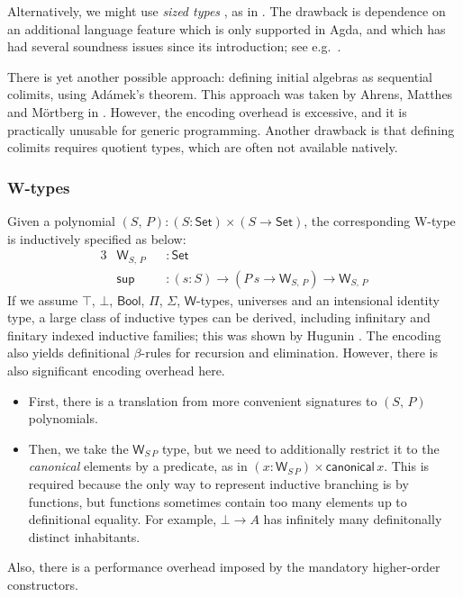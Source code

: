 \documentclass[12pt,a4paper,twoside,openany]{book}
\theoremstyle{remark}
\theoremstyle{definition}
\theoremstyle{theorem}
\newcommand{\ms}[1]{\mathsf{#1}}
\newcommand{\Set}{\mathsf{Set}}
\newcommand{\Bool}{\ms{Bool}}
\begin{document}
Alternatively, we might use \emph{sized types} \cite{abel17normalization}, as
in \cite{allais20type}. The drawback is dependence on an additional
language feature which is only supported in Agda, and which has had several
soundness issues since its introduction; see e.g.\ \cite{agda-sized-issue}.

There is yet another possible approach: defining initial algebras as sequential
colimits, using Adámek's theorem. This approach was taken by Ahrens, Matthes and
Mörtberg in \cite{ahrens19from}. However, the encoding overhead is excessive,
and it is practically unusable for generic programming. Another drawback is that
defining colimits requires quotient types, which are often not available
natively.

\subsubsection{W-types}
Given a polynomial $(S,\,P) : (S : \Set) \times (S \to \Set)$, the corresponding
W-type is inductively specified as below:
\begin{alignat*}{3}
  & \ms{W}_{S,\,P} &&: \Set \\
  & \ms{sup} &&: (s : S) \to (P\,s \to \ms{W}_{S,\,P}) \to \ms{W}_{S,\,P}
\end{alignat*}
If we assume $\top$, $\bot$, $\Bool$, $\Pi$, $\Sigma$, $\ms{W}$-types, universes
and an intensional identity type, a large class of inductive types can be
derived, including infinitary and finitary indexed inductive families; this
was shown by Hugunin \cite{whynotw}. The encoding also yields definitional
$\beta$-rules for recursion and elimination. However, there is also significant
encoding overhead here.
\begin{itemize}
  \item
    First, there is a translation from more convenient signatures to $(S,\,P)$ polynomials.
  \item Then, we take the $\ms{W}_{S\,P}$ type, but we need to additionally
    restrict it to the \emph{canonical} elements by a predicate, as in $(x :
    \ms{W}_{S\,P}) \times \ms{canonical}\,x$. This is required because the only
    way to represent inductive branching is by functions, but functions
    sometimes contain too many elements up to definitional equality. For
    example, $\bot \to A$ has infinitely many definitonally distinct
    inhabitants.
\end{itemize}
Also, there is a performance overhead imposed by the mandatory higher-order
constructors.
\end{document}
